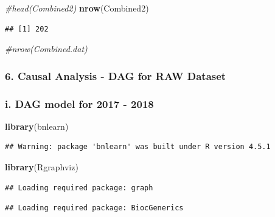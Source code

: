 \documentclass[
]{article}
\newenvironment{Shaded}{\begin{snugshade}}{\end{snugshade}}
\newcommand{\CommentTok}[1]{\textcolor[rgb]{0.56,0.35,0.01}{\textit{#1}}}
\newcommand{\FunctionTok}[1]{\textcolor[rgb]{0.13,0.29,0.53}{\textbf{#1}}}
\newcommand{\NormalTok}[1]{#1}
\begin{document}
\begin{Shaded}
\begin{Highlighting}[]
\CommentTok{\#head(Combined2)}
\FunctionTok{nrow}\NormalTok{(Combined2)}
\end{Highlighting}
\end{Shaded}

\begin{verbatim}
## [1] 202
\end{verbatim}

\begin{Shaded}
\begin{Highlighting}[]
\CommentTok{\#nrow(Combined.dat)}
\end{Highlighting}
\end{Shaded}

\subsubsection{6. Causal Analysis - DAG for RAW
Dataset}\label{causal-analysis---dag-for-raw-dataset}

\subsubsection{i. DAG model for 2017 -
2018}\label{i.-dag-model-for-2017---2018}

\begin{Shaded}
\begin{Highlighting}[]
\FunctionTok{library}\NormalTok{(bnlearn)}
\end{Highlighting}
\end{Shaded}

\begin{verbatim}
## Warning: package 'bnlearn' was built under R version 4.5.1
\end{verbatim}

\begin{Shaded}
\begin{Highlighting}[]
\FunctionTok{library}\NormalTok{(Rgraphviz)}
\end{Highlighting}
\end{Shaded}

\begin{verbatim}
## Loading required package: graph
\end{verbatim}

\begin{verbatim}
## Loading required package: BiocGenerics
\end{verbatim}
\end{document}
